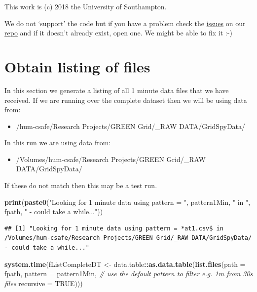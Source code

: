 \documentclass[]{article}
\newenvironment{Shaded}{\begin{snugshade}}{\end{snugshade}}
\newcommand{\KeywordTok}[1]{\textcolor[rgb]{0.13,0.29,0.53}{\textbf{#1}}}
\newcommand{\DataTypeTok}[1]{\textcolor[rgb]{0.13,0.29,0.53}{#1}}
\newcommand{\StringTok}[1]{\textcolor[rgb]{0.31,0.60,0.02}{#1}}
\newcommand{\CommentTok}[1]{\textcolor[rgb]{0.56,0.35,0.01}{\textit{#1}}}
\newcommand{\OtherTok}[1]{\textcolor[rgb]{0.56,0.35,0.01}{#1}}
\newcommand{\OperatorTok}[1]{\textcolor[rgb]{0.81,0.36,0.00}{\textbf{#1}}}
\newcommand{\NormalTok}[1]{#1}
\providecommand{\tightlist}{%
  \setlength{\itemsep}{0pt}\setlength{\parskip}{0pt}}
\begin{document}
This work is (c) 2018 the University of Southampton.

We do not `support' the code but if you have a problem check the
\href{https://git.soton.ac.uk/ba1e12/nzGREENGrid/issues}{issues} on our
\href{https://git.soton.ac.uk/ba1e12/nzGREENGrid}{repo} and if it
doesn't already exist, open one. We might be able to fix it :-)

\section{Obtain listing of files}\label{obtain-listing-of-files}

In this section we generate a listing of all 1 minute data files that we
have received. If we are running over the complete dataset then we will
be using data from:

\begin{itemize}
\tightlist
\item
  /hum-csafe/Research Projects/GREEN Grid/\_RAW DATA/GridSpyData/
\end{itemize}

In this run we are using data from:

\begin{itemize}
\tightlist
\item
  /Volumes/hum-csafe/Research Projects/GREEN Grid/\_RAW
  DATA/GridSpyData/
\end{itemize}

If these do not match then this may be a test run.

\begin{Shaded}
\begin{Highlighting}[]
\KeywordTok{print}\NormalTok{(}\KeywordTok{paste0}\NormalTok{(}\StringTok{"Looking for 1 minute data using pattern = "}\NormalTok{, pattern1Min, }\StringTok{" in "}\NormalTok{, fpath, }\StringTok{" - could take a while..."}\NormalTok{))}
\end{Highlighting}
\end{Shaded}

\begin{verbatim}
## [1] "Looking for 1 minute data using pattern = *at1.csv$ in /Volumes/hum-csafe/Research Projects/GREEN Grid/_RAW DATA/GridSpyData/ - could take a while..."
\end{verbatim}

\begin{Shaded}
\begin{Highlighting}[]
\KeywordTok{system.time}\NormalTok{(fListCompleteDT <-}\StringTok{ }\NormalTok{data.table}\OperatorTok{::}\KeywordTok{as.data.table}\NormalTok{(}\KeywordTok{list.files}\NormalTok{(}\DataTypeTok{path =}\NormalTok{ fpath, }\DataTypeTok{pattern =}\NormalTok{ pattern1Min, }\CommentTok{# use the default pattern to filter e.g. 1m from 30s files}
                                            \DataTypeTok{recursive =} \OtherTok{TRUE}\NormalTok{)))}
\end{Highlighting}
\end{Shaded}
\end{document}
